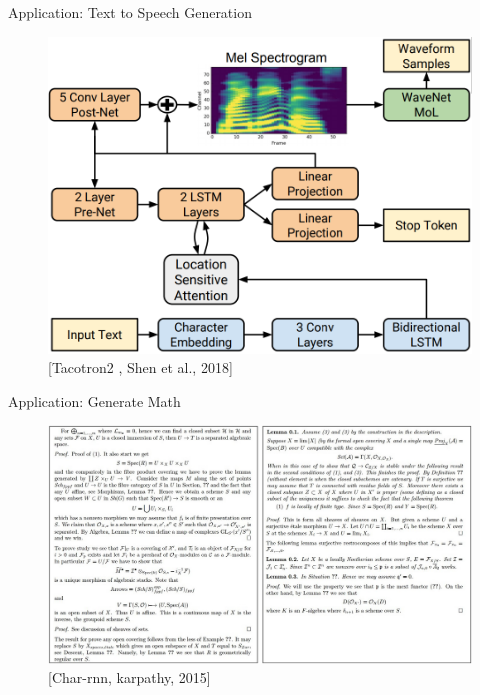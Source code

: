 \begin{frame}[allowframebreaks]{Application: Text to Speech Generation}
    \begin{figure}
    \centering
    \includegraphics[height=0.8\textheight]{images/dul/slide_35_1_img.png}
    \caption{[Tacotron2 , Shen et al., 2018]}
    \end{figure}
\end{frame}

\begin{frame}[allowframebreaks]{Application: Generate Math}
    \begin{figure}
    \centering
    \includegraphics[height=0.8\textheight]{images/dul/slide_43_1_img.png}
    \caption{[Char-rnn, karpathy, 2015]}
    \end{figure}
\end{frame}


